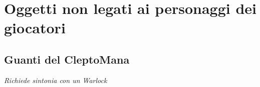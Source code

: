 





\section{Oggetti non legati ai personaggi dei giocatori}

\subsection{Guanti del CleptoMana}
\textit{Richiede sintonia con un Warlock} 

